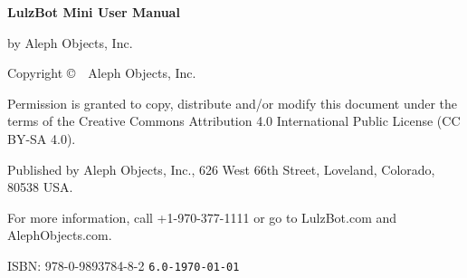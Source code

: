 %
%
%
%
%


\clearpage\null\vfill
\begingroup 
\thispagestyle{empty}
\footnotesize\raggedright
\setlength{\parskip}{0.5\baselineskip}

\textbf{LulzBot\textsuperscript{\miniscule{\textregistered}} Mini User Manual}

by Aleph Objects, Inc.

Copyright \copyright\ \the\year\ Aleph Objects, Inc.\par
Permission is granted to copy, distribute and\slash or modify 
this document under the terms of the
Creative Commons Attribution 4.0 International Public License
(CC BY-SA 4.0).

Published by Aleph Objects, Inc., 626 West 66th Street, Loveland, Colorado, 80538 USA.

For more information, call +1-970-377-1111 or go to LulzBot.com and AlephObjects.com.

ISBN: 978-0-9893784-8-2
\renewcommand{\dateseparator}{}
\hfill\texttt{6.0-\yyyymmdddate\today} %
\endgroup
\pagebreak{}
